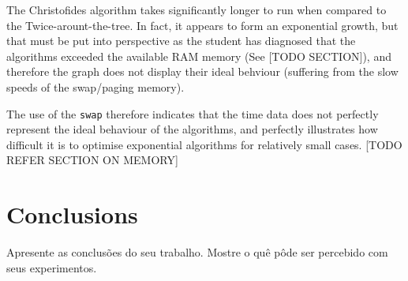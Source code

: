 \documentclass[12pt]{article}
\begin{document}
The Christofides algorithm takes significantly longer to run when compared to the Twice-arount-the-tree. 
In fact, it appears to form an exponential growth, but that must be put into perspective as the student 
has diagnosed that the algorithms exceeded the available RAM memory (See [TODO SECTION]), and therefore 
the graph does not display their ideal behviour (suffering from the slow speeds of the swap/paging memory).

The use of the \texttt{swap} therefore indicates that the time data does not perfectly represent the ideal behaviour 
of the algorithms, and perfectly illustrates how difficult it is to optimise exponential algorithms for relatively 
small cases. [TODO REFER SECTION ON MEMORY]

\section{Conclusions}
    Apresente as conclusões do seu trabalho. Mostre o quê pôde ser percebido
    com seus experimentos.



\end{document}
